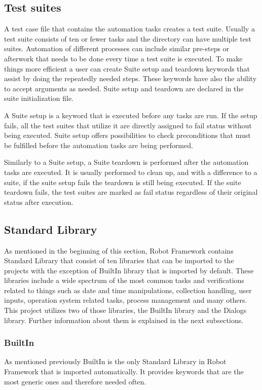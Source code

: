 \subsection{Test suites}
A test case file that contains the automation tasks creates a test suite. Usually a test suite consists of ten or fewer tasks and the directory can have multiple test suites.
Automation of different processes can include similar pre-steps or afterwork that needs to be done every time a test suite is executed.
To make things more efficient a user can create Suite setup and teardown keywords that assist by doing the repeatedly needed steps.
These keywords have also the ability to accept arguments as needed.
Suite setup and teardown are declared in the suite initialization file.

A Suite setup is a keyword that is executed before any tasks are run.
If the setup fails, all the test suites that utilize it are directly assigned to fail status without being executed.
Suite setup offers possibilities to check preconditions that must be fulfilled before the automation tasks are being performed.

Similarly to a Suite setup, a Suite teardown is performed after the automation tasks are executed.
It is usually performed to clean up, and with a difference to a suite, if the suite setup fails the teardown is still being executed.
If the suite teardown fails, the test suites are marked as fail status regardless of their original status after execution.

\subsection{Standard Library}
As mentioned in the beginning of this section, Robot Framework contains Standard Library that consist of ten libraries that can be imported to the projects with the exception of BuiltIn library that is imported by default.
These libraries include a wide spectrum of the most common tasks and verifications related to things such as date and time manipulations, collection handling, user inputs, operation system related tasks, process management and many others.
This project utilizes two of those libraries, the BuiltIn library and the Dialogs library.
Further information about them is explained in the next subsections.
\subsubsection{BuiltIn}
As mentioned previously BuiltIn is the only Standard Library in Robot Framework that is imported automatically.
It provides keywords that are the most generic ones and therefore needed often.

